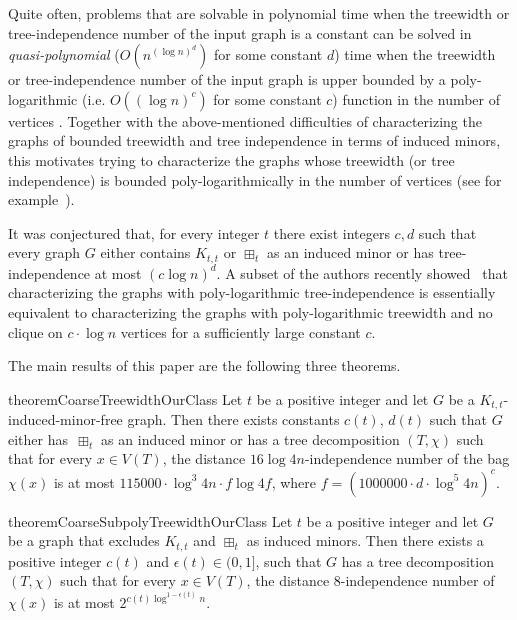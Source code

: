 %
Quite often, problems that are solvable in polynomial time when the treewidth or tree-independence number of the input graph is a constant can be solved in {\em quasi-polynomial} ($O(n^{(\log n)^d})$ for some constant $d$) time when the treewidth or tree-independence number of the input graph is upper bounded by a poly-logarithmic (i.e. $O((\log n)^c)$ for some constant $c$) function in the number of vertices \cite{lokshtanov2026findinglargesparseinduced}. 
%
Together with the above-mentioned difficulties of characterizing the graphs of bounded treewidth and tree independence in terms of induced minors, this motivates trying to characterize the graphs whose treewidth (or tree independence) is bounded poly-logarithmically in the number of vertices (see for example~\cite{tw3,treeAlpha4}). 

It was conjectured \cite{treeAlpha5} that, for every integer $t$ there exist integers $c, d$ such that every graph $G$ either contains $K_{t,t}$ or $\boxplus_t$ as an induced minor or has tree-independence at most $(c \log n)^{d}$.
A subset of the authors recently showed~\cite{chudnovsky2025treewidth} that characterizing the graphs with poly-logarithmic tree-independence is essentially equivalent to characterizing the graphs with poly-logarithmic treewidth and no clique on $c \cdot \log n$ vertices for a sufficiently large constant $c$. 

The main results of this paper are the following three theorems.
\begin{restatable}{theorem}{CoarseTreewidthOurClass}\label{thm:coarse_treewidth_our_class}
    Let $t$ be a positive integer and let $G$ be a $K_{t,t}$-induced-minor-free graph. Then there exists constants $c(t)$, $d(t)$ such that $G$ either has $\, \boxplus_t$ as an induced minor or has a tree decomposition $(T,\chi)$ such that for every $x\in V(T)$, the distance $16\log 4n$-independence number of the bag $\chi(x)$ is at most $115000 \cdot \log^3 4n \cdot f \log 4f$, where $f = (1000000\cdot d\cdot \log^5 4n)^{c}$.
\end{restatable}

\begin{restatable}{theorem}{CoarseSubpolyTreewidthOurClass}\label{thm:coarse_subpoly_treewidth_our_class}
    Let $t$ be a positive integer and let $G$ be a graph that excludes $K_{t,t}$ and $\boxplus_t$ as induced minors. Then there exists a positive integer $c(t)$ and $\epsilon(t)\in(0,1]$, such that $G$ has a tree decomposition $(T,\chi)$ such that for every $x\in V(T)$, the distance $8$-independence number of $\chi(x)$ is at most $2^{c(t) \log^{1-\epsilon(t)} n}$.
\end{restatable}


